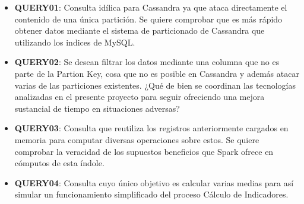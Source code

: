 \begin{itemize}
	
	\item \textbf{QUERY01}: Consulta idílica para Cassandra ya que ataca directamente el contenido de una única partición. Se quiere comprobar que es más rápido obtener datos mediante el sistema de particionado de Cassandra que utilizando los indices de MySQL.
	
	\item \textbf{QUERY02}: Se desean filtrar los datos mediante una columna que no es parte de la Partion Key, cosa que no es posible en Cassandra y además atacar varias de las particiones existentes. ¿Qué de bien se coordinan las tecnologías analizadas en el presente proyecto para seguir ofreciendo una mejora sustancial de tiempo en situaciones adversas?
	
	\item \textbf{QUERY03}: Consulta que reutiliza los registros anteriormente cargados en memoria para computar diversas operaciones sobre estos. Se quiere comprobar la veracidad de los supuestos beneficios que Spark ofrece en cómputos de esta índole.
	
	\item \textbf{QUERY04}: Consulta cuyo único objetivo es calcular varias medias para así simular un funcionamiento simplificado del proceso Cálculo de Indicadores.  
	
\end{itemize}





